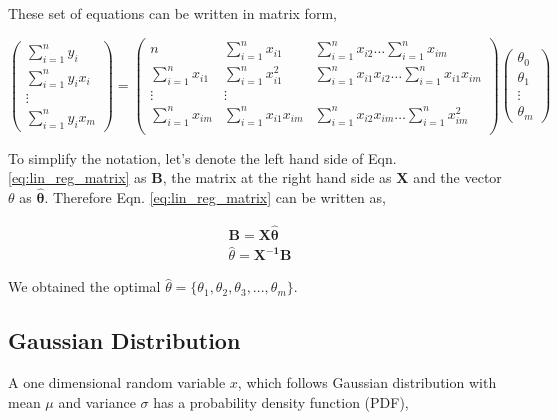 \documentclass[english]{tktltiki}
\begin{document}
These set of equations can be written in matrix form,

$$
\begin{pmatrix}
\sum_{i=1}^n y_i \\
\sum_{i=1}^n y_i x_i \\
\vdots \\
\sum_{i=1}^n y_i x_m
\end{pmatrix}
=%
\begin{pmatrix}
n & \sum_{i=1}^n x_{i1} & \sum_{i=1}^n x_{i2} \hdots \sum_{i=1}^n x_{im} \\
\sum_{i=1}^n x_{i1} & \sum_{i=1}^n x_{i1}^2 & \sum_{i=1}^n x_{i1} x_{i2} \hdots \sum_{i=1}^n x_{i1} x_{im} \\
\vdots&\vdots \\
\sum_{i=1}^n x_{im} & \sum_{i=1}^n x_{i1} x_{im} & \sum_{i=1}^n x_{i2} x_{im} \hdots \sum_{i=1}^n x_{im}^2 \\
\end{pmatrix}
%
\begin{pmatrix}
\theta_0 \\
\theta_1 \\
\vdots \\
\theta_m
\end{pmatrix}
\label{eq:lin_reg_matrix}
$$

To simplify the notation, let's denote the left hand side of Eqn. \ref{eq:lin_reg_matrix} as $\mathbf{B}$, the matrix at the right hand side as $\mathbf{X}$ and the vector $\theta$ as $\hat{\mathbf{\theta}}$. Therefore Eqn. \ref{eq:lin_reg_matrix} can be written as,

\begin{eqnarray}
\mathbf{B} = \mathbf{X \hat{\theta}} \nonumber \\
\hat{\theta} = \mathbf{X^{-1}} \mathbf{B}
\label{reg_param}
\end{eqnarray}

We obtained the optimal $\hat{\theta} = \{\theta_1, \theta_2, \theta_3, ...,\theta_m\}$.

\subsection{Gaussian Distribution}

A one dimensional random variable $x$, which follows Gaussian distribution with mean $\mu$ and variance $\sigma$ has a probability density function (PDF),
\end{document}
